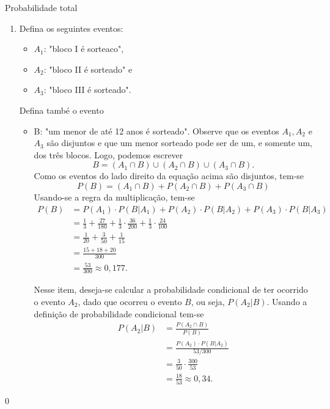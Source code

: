 \begin{answer}{Probabilidade total}
{
\begin{enumerate}
\item Defina os seguintes eventos:
\begin{itemize}
\item $A_1$: "bloco I é sorteaco",
\item $A_2$: "bloco II é sorteado" e
\item $A_3$: "bloco III é sorteado".
\end{itemize}
Defina també o evento 
\begin{itemize}
\item B: "um menor de até 12 anos é sorteado". Observe que os eventos $A_1,A_2$ e $A_3$ são disjuntos e que um menor sorteado pode ser de um, e somente um, dos três blocos. Logo, podemos escrever
\begin{equation*}
B=(A_1\cap B)\cup(A_2\cap B)\cup(A_3\cap B).
\end{equation*}
Como os eventos do lado direito da equação acima são disjuntos, tem-se\begin{equation*}
P(B)=(A_1\cap B)+P(A_2\cap B)+P(A_3\cap B)
\end{equation*}
Usando-se a regra da multiplicação, tem-se
\begin{align*}
P(B)&=P(A_1)\cdot P(B|A_1)+P(A_2)\cdot P(B|A_2)+P(A_3)\cdot P(B|A_3)\\
&=\frac{1}{3}+\frac{27}{180}+\frac{1}{3}\cdot\frac{36}{200}+\frac{1}{3}\cdot\frac{24}{100}\\
&=\frac{1}{20}+\frac{3}{50}+\frac{1}{15}\\
&=\frac{15+18+20}{300}\\
&=\frac{53}{300}\approx0{,}177.
\end{align*}

Nesse item, deseja-se calcular a probabilidade condicional de ter ocorrido o evento $A_2$, dado que ocorreu o evento $B$, ou seja, $P(A_2|B)$. Usando a definição de probabilidade condicional tem-se
\begin{align*}
P(A_2|B)&=\frac{P(A_2\cap B)}{P(B)}\\
&=\frac{P(A_2)\cdot P(B|A_2)}{53/300}\\
&=\frac{3}{50}\cdot\frac{300}{53}\\
&=\frac{18}{53}\approx0{,}34.
\end{align*}
\end{itemize}
\end{enumerate}
}{0}
\end{answer}

